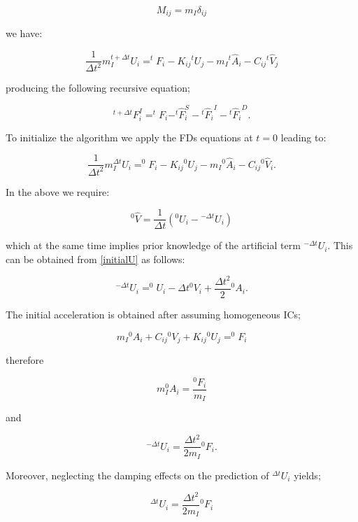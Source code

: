 \documentclass[12pt,letterpaper]{article}
\begin{document}
\[
M_{ij}=m_I\delta_{ij}
\]

we have:


\begin{equation}
\dfrac{1}{\Delta t^2}m_I ^{t+ \Delta t}U_i=^{t}F_i-K_{ij} {^{t}U_j}-m_{I} {^{t}\hat{A}_i}-C_{ij}{^{t}\hat{V}_j}
\label{equildecoupled2}
\end{equation}


producing the following recursive equation;

\begin{equation}
^{t+\Delta t} F_i^I=^{t}F_i-^{t} \hat{F}^S_i-{^{t}\hat{F}_i}^I-{^{t}\hat{F}_i}^D.
\label{forces3}
\end{equation}


To initialize the algorithm we apply the FDs equations at $t=0$ leading to:

\[
\dfrac{1}{\Delta t^2}m_I ^{\Delta t}U_i=^{0}F_i-K_{ij} {^{0}U}_j-m_I {^{0}\hat{A}}_i-C_{ij} {^{0}\hat{V}}_i.
\]

In the above we require:

\[
^{0}\hat{V} = \frac{1}{{\Delta t}}\left( {{}^0{U_i} - {}^{ - \Delta t}{U_i}} \right)
\]

which at the same time implies prior knowledge of the artificial term  $^{-\Delta t} U_i$. This can be obtained from \eqref{initialU} as follows:

\begin{equation}
^{-\Delta t}U_i=^{0}U_i-\Delta t {^{0}V}_i+\dfrac{\Delta t^2}{2} {^{0}A}_i.
\label{initialU2}
\end{equation}

The initial acceleration is obtained after assuming homogeneous ICs;

\[
m_{I} {^{0}A}_i+C_{ij} {^{0}V}_j +K_{ij} {^{0}U}_j=^{0}F_i
\]

therefore

\[m_{I} ^{0}A_i=\dfrac{^{0}F_i}{m_I}\]

and

\[^{-\Delta t} U_i=\dfrac{\Delta t^2}{2m_I}{^{0}F}_i.
\]



Moreover, neglecting the damping effects on the prediction of $^{\Delta t}U_i$ yields;

\[
^{\Delta t} U_i=\dfrac{\Delta t^2}{2m_I}{^{0}F}_i
\]

\end{document}
